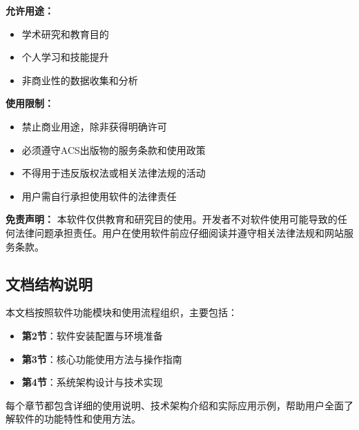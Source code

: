 \textbf{允许用途：}
\begin{itemize}
    \item 学术研究和教育目的
    \item 个人学习和技能提升
    \item 非商业性的数据收集和分析
\end{itemize}

\textbf{使用限制：}
\begin{itemize}
    \item 禁止商业用途，除非获得明确许可
    \item 必须遵守ACS出版物的服务条款和使用政策
    \item 不得用于违反版权法或相关法律法规的活动
    \item 用户需自行承担使用软件的法律责任
\end{itemize}

\textbf{免责声明：}
本软件仅供教育和研究目的使用。开发者不对软件使用可能导致的任何法律问题承担责任。用户在使用软件前应仔细阅读并遵守相关法律法规和网站服务条款。

\subsection{文档结构说明}
\label{ssec:document_structure}
本文档按照软件功能模块和使用流程组织，主要包括：
\begin{itemize}
    \item \textbf{第2节}：软件安装配置与环境准备
    \item \textbf{第3节}：核心功能使用方法与操作指南
    \item \textbf{第4节}：系统架构设计与技术实现
\end{itemize}

每个章节都包含详细的使用说明、技术架构介绍和实际应用示例，帮助用户全面了解软件的功能特性和使用方法。